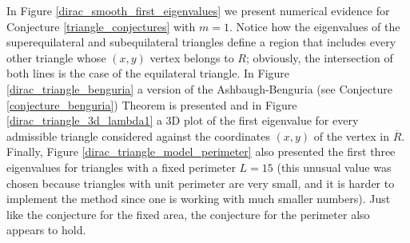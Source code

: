 In Figure \ref{dirac_smooth_first_eigenvalues} we present numerical evidence for Conjecture \ref{triangle_conjectures} with \(m=1\). Notice how the eigenvalues of the superequilateral and subequilateral triangles define a region that includes every other triangle whose \((x, y)\) vertex belongs to \(R\); obviously, the intersection of both lines is the case of the equilateral triangle. In Figure \ref{dirac_triangle_benguria} a version of the Ashbaugh-Benguria (see Conjecture \ref{conjecture_benguria}) Theorem is presented and in Figure \ref{dirac_triangle_3d_lambda1} a 3D plot of the first eigenvalue for every admissible triangle considered against the coordinates \((x,y)\) of the vertex in \(\overline{R}\). Finally, Figure \ref{dirac_triangle_model_perimeter} also presented the first three eigenvalues for triangles with a fixed perimeter \(L = 15\) (this unusual value was chosen because triangles with unit perimeter are very small, and it is harder to implement the method since one is working with much smaller numbers). Just like the conjecture for the fixed area, the conjecture for the perimeter also appears to hold.

